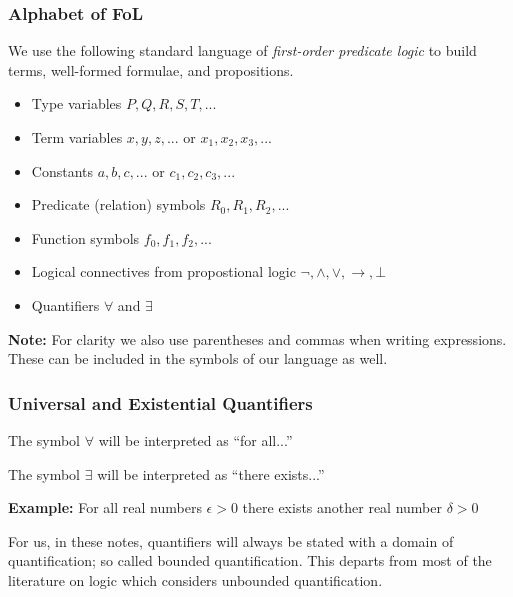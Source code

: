 \documentclass{beamer}
\theoremstyle{indentDefn} \newtheorem{defn}[]{Definition}
\begin{document}
\begin{frame}
	\frametitle{Alphabet of FoL}
	
	We use the following standard language of \emph{first-order predicate logic} to build terms, well-formed formulae, and propositions.
	
	\begin{itemize}
		\item Type variables $P, Q, R, S, T, ...$
		\item Term variables $x,y,z,...$ or $x_{1}, x_{2}, x_{3},...$
		\item Constants $a,b,c, ...$ or $c_{1}, c_{2}, c_{3}, ...$
		\item Predicate (relation) symbols $R_{0}, R_{1}, R_{2}, ... $
		\item Function symbols $f_{0}, f_{1}, f_{2}, ... $
		\item Logical connectives from propostional logic $\lnot, \land, \lor, \rightarrow, \bot$
		\item Quantifiers $\forall$ and $\exists$
	\end{itemize}
	
	{\bf Note:} For clarity we also use parentheses and commas when writing expressions. These can be included in the symbols of our language as well.
	
	
\end{frame}

\begin{frame}
	\frametitle{Universal and Existential Quantifiers}
	
	The symbol $\forall$ will be interpreted as ``for all...''
	
	The symbol $\exists$ will be interpreted as ``there exists...''
	
	\vspace{0.5cm}
	
	{\bf Example:}
	For all real numbers $\epsilon >0$ there exists another real number $\delta > 0$
	
	\vspace{2cm}
	
	For us, in these notes, quantifiers will always be stated with a domain of quantification; so called bounded quantification. This departs from most of the literature on logic which considers unbounded quantification. 
	
\end{frame}
\end{document}
